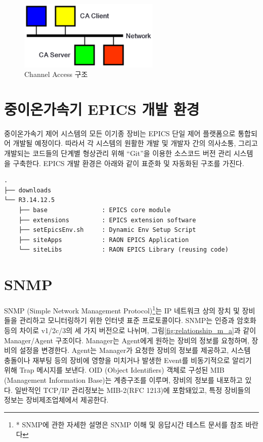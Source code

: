 \documentclass[11pt
  , a4paper
  , article
  , oneside
]{memoir}
\begin{document}
\begin{figure}[h!]
  \centering
  \includegraphics[width=0.6\textwidth]{./images/epics.eps}
  \caption{Channel Access 구조}
  \label{fig:ca}     
\end{figure}

\section{중이온가속기 EPICS 개발 환경}
중이온가속기 제어 시스템의 모든 이기종 장비는 EPICS 단일 제어 플랫폼으로 통합되어 개발될 예정이다. 따라서 각 시스템의 원활한 개발 및 개발자 간의 의사소통, 그리고 개발되는 코드들의 단계별 형상관리 위해 “Git”을 이용한 소스코드 버전 관리 시스템을 구축한다. EPICS 개발 환경은 아래와 같이 표준화 및 자동화된 구조를 가진다.

{\scriptsize
\begin{verbatim}
.
├── downloads              
└── R3.14.12.5             
    ├── base               : EPICS core module
    ├── extensions         : EPICS extension software
    ├── setEpicsEnv.sh     : Dynamic Env Setup Script
    ├── siteApps           : RAON EPICS Application
    └── siteLibs           : RAON EPICS Library (reusing code)
\end{verbatim}
}

\section{SNMP}
SNMP (Simple Network Management Protocol)\footnote{* SNMP에 관한 자세한 설명은 SNMP 이해 및 응답시간 테스트 문서를 참조 바란다}는 IP 네트워크 상의 장치 및 장비들을 관리하고 모니터링하기 위한 인터넷 표준 프로토콜이다\citep{snmp}. SNMP는 인증과 암호화 등의 차이로 v1/2c/3의 세 가지 버전으로 나뉘며, 그림\ref{fig:relationship_m_a}과 같이 Manager/Agent 구조이다\citep{snmpm_a}. Manager는 Agent에게 원하는 장비의 정보를 요청하며, 장비의 설정을 변경한다. Agent는 Manager가 요청한 장비의 정보를 제공하고, 시스템 충돌이나 재부팅 등의 장비에 영향을 미치거나 발생한 Event를 비동기적으로 알리기 위해 Trap 메시지를 보낸다. OID (Object Identifiers) 객체로 구성된 MIB (Management Information Base)는 계층구조를 이루며, 장비의 정보를 내포하고 있다. 일반적인 TCP/IP 관리정보는 MIB-2(RFC 1213)에 포함돼있고, 특정 장비들의 정보는 장비제조업체에서 제공한다. 
\end{document}
